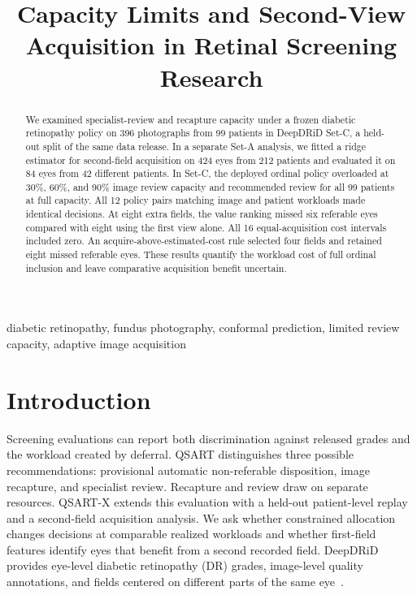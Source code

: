 \documentclass[conference]{IEEEtran}
\title{Capacity Limits and Second-View Acquisition in Retinal Screening Research}
\author{\IEEEauthorblockN{QSART-X author-review draft}
\IEEEauthorblockA{16 November 2026}}
\begin{document}
\maketitle

\begin{abstract}
We examined specialist-review and recapture capacity under a frozen diabetic
retinopathy policy on 396 photographs from 99 patients in DeepDRiD Set-C, a
held-out split of the same data release. In a separate Set-A analysis, we
fitted a ridge estimator for second-field acquisition on 424 eyes from 212
patients and evaluated it on 84 eyes from 42 different patients. In Set-C,
the deployed ordinal policy overloaded at 30\%, 60\%, and 90\% image review
capacity and recommended review for all 99 patients at full capacity. All 12
policy pairs matching image and patient workloads made identical decisions.
At eight extra fields, the value ranking missed six referable eyes compared
with eight using the first view alone. All 16 equal-acquisition cost
intervals included zero. An acquire-above-estimated-cost rule selected
four fields and retained eight missed referable eyes. These results
quantify the workload cost of full ordinal inclusion and leave comparative
acquisition benefit uncertain.
\end{abstract}

\begin{IEEEkeywords}
diabetic retinopathy, fundus photography, conformal prediction, limited review
capacity, adaptive image acquisition
\end{IEEEkeywords}

\section{Introduction}
Screening evaluations can report both discrimination against released grades
and the workload created by deferral. QSART distinguishes three possible
recommendations: provisional automatic non-referable disposition, image
recapture, and specialist review. Recapture and review draw on separate
resources. QSART-X extends this evaluation with a held-out patient-level replay
and a second-field acquisition analysis. We ask whether constrained allocation
changes decisions at comparable realized workloads and whether first-field
features identify eyes that benefit from a second recorded field. DeepDRiD
provides eye-level diabetic retinopathy (DR) grades, image-level quality
annotations, and fields centered on different parts of the same eye~\cite{R01}.
\end{document}
